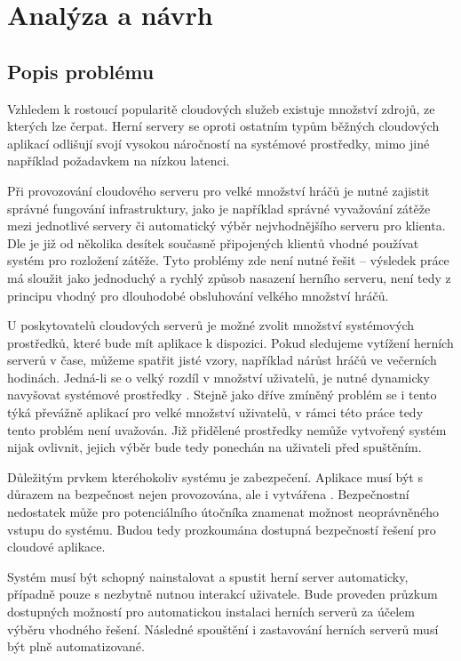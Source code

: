 \chapter[Analýza a návrh]{Analýza a návrh}

\section{Popis problému}

Vzhledem k rostoucí popularitě cloudových služeb \cite{statista_cloud_revenue} existuje množství zdrojů, ze kterých lze čerpat.
Herní servery se oproti ostatním typům běžných cloudových aplikací odlišují svojí vysokou náročností
na systémové prostředky, mimo jiné například požadavkem na nízkou latenci.

Při provozování cloudového serveru pro velké množství hráčů je nutné zajistit správné fungování infrastruktury,
jako je například správné vyvažování zátěže mezi jednotlivé servery či automatický výběr nejvhodnějšího serveru
pro klienta. Dle \cite{building_cloud_mog_server} je již od několika desítek současně připojených klientů vhodné
používat systém pro rozložení zátěže. Tyto problémy zde není nutné řešit -- výsledek práce má sloužit jako jednoduchý a rychlý
způsob nasazení herního serveru, není tedy z principu vhodný pro dlouhodobé obsluhování velkého množství hráčů.

U poskytovatelů cloudových serverů je možné zvolit množství systémových prostředků, které bude mít aplikace k dispozici.
Pokud sledujeme vytížení herních serverů v čase, můžeme spatřit jisté vzory, například nárůst hráčů ve večerních hodinách.
Jedná-li se o velký rozdíl v množství uživatelů, je nutné dynamicky navyšovat systémové prostředky \cite{efficient_resources}.
Stejně jako dříve zmíněný problém se i tento týká převážně aplikací pro velké množství uživatelů, v rámci této práce tedy tento problém není uvažován.
Již přidělené prostředky nemůže vytvořený systém nijak ovlivnit, jejich výběr bude tedy ponechán na uživateli před spuštěním.

Důležitým prvkem kteréhokoliv systému je zabezpečení. Aplikace musí být s důrazem na bezpečnost nejen provozována,
ale i vytvářena \cite{securing_cloud}. Bezpečnostní nedostatek může pro potenciálního útočníka znamenat možnost neoprávněného vstupu do systému.
Budou tedy prozkoumána dostupná bezpečností řešení pro cloudové aplikace.

Systém musí být schopný nainstalovat a spustit herní server automaticky, případně pouze s nezbytně nutnou interakcí uživatele.
Bude proveden průzkum dostupných možností pro automatickou instalaci herních serverů za účelem výběru vhodného řešení.
Následné spouštění i zastavování herních serverů musí být plně automatizované.

